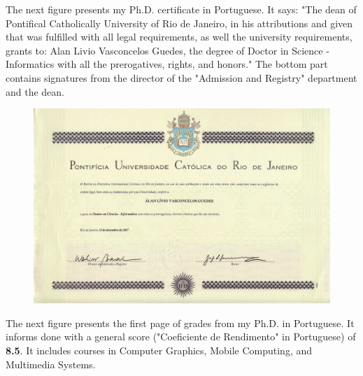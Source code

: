 \documentclass[10pt,a4paper,sans,colorlinks]{moderncv}
\begin{document}
The next figure presents my Ph.D. certificate in Portuguese.
It says: "The dean of Pontifical Catholically University of Rio de Janeiro, in his attributions and given that was fulfilled with all legal requirements, as well the university requirements, grants to: Alan Livio Vasconcelos Guedes, the degree of Doctor in Science - Informatics with all the prerogatives, rights, and honors."
The bottom part contains signatures from the director of the "Admission and Registry" department and the dean.

\begin{figure}
    \centering
    \includegraphics[align=t,width=\textwidth,height=0.3\paperheight, keepaspectratio=true]{certificates/phd-certificate.pdf}
\end{figure}

\newpage
The next figure presents the first page of grades from my Ph.D. in Portuguese.
It informs done with a general score ("Coeficiente de Rendimento" in Portuguese) of \textbf{8.5}.
It includes courses in Computer Graphics, Mobile Computing, and Multimedia Systems.
\end{document}
